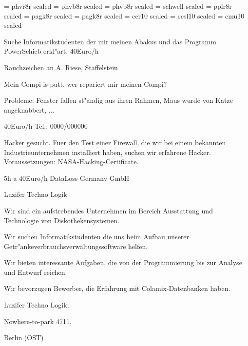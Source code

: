 \documentclass[a4paper, 12pt]{article}
\begin{document}
  
 

\font\helv = phvr8r scaled 
\font\helvbold = phvb8r scaled 
\font\helvboldbig = phvb8r scaled 
\font\schwell = schwell scaled 
\font\palatin = pplr8r scaled 
\font\avantg = pagk8r scaled 
\font\avantgbig = pagk8r scaled 
\font\concrete = ccr10 scaled 
\font\concslbig = ccsl10 scaled 
\font\unitalic = cmu10 scaled 
  
  {\tt\large

  Suche Informatikstudenten der mir meinen Abakus und das
  Programm PowerSchieb erkl"art. 40Euro/h
     
  \hfill   Rauchzeichen an A. Riese, Staffelstein

  }

\vskip 5cm

  {\tt\large

  Mein Compi is putt, wer repariert mir meinen Compi?

  \medskip

  Probleme: Fenster fallen st"andig aus ihren Rahmen,
    Maus wurde von Katze angeknabbert, ...

  40Euro/h
  \hfill                          Tel.: 0000/000000

  }

\vskip 5cm

  { \palatin \baselineskip 17pt

  Hacker gesucht. Fuer den Test einer Firewall, 
  die wir bei einem bekannten Industrieunternehmen installiert
  haben, suchen wir erfahrene Hacker. Voraussetzungen:
  NASA-Hacking-Certificate.

  \smallskip

  5h a 40Euro/h  \hfill   DataLoss Germany GmbH 

  }

\vskip 5cm

  {\sf

  {\huge

  Luzifer Techno Logik

  } 
  \large
  \bigskip

  Wir sind ein aufstrebendes Unternehmen im Bereich
  Ausstattung und Technologie von Diskothekensystemen.

  \medskip

  Wir suchen Informatikstudenten die uns beim Aufbau unserer
  Getr"ankeverbrauchsverwaltungssoftware helfen.

  \medskip

  Wir bieten interessante Aufgaben, die von der Programmierung
  bis zur Analyse und Entwurf reichen. 

  \medskip

  Wir bevorzugen Bewerber, die Erfahrung mit Colamix-Datenbanken
  haben.

  \medskip 

  \hfill                  Luzifer Techno Logik,

  \hfill                  Nowhere-to-park 4711,

  \hfill                  Berlin (OST)

  } 
\end{document}
